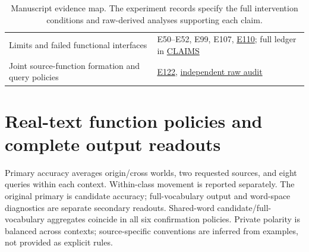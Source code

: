 \documentclass[11pt]{article}
\begin{document}
\begin{table}[t]
\begin{tabularx}{\textwidth}{>{\raggedright\arraybackslash}X>{\raggedleft\arraybackslash}X}
Limits and failed functional interfaces & E50--E52, E99, E107, \href{experiments/E110-learned-relation-fixed-label-stream.md}{E110}; full ledger in \href{CLAIMS.md}{CLAIMS} \\
Joint source-function formation and query policies & \href{experiments/E122-source-preserving-formation.md}{E122}, \href{results/e122/independent_review_2026-10-12.md}{independent raw audit} \\
\bottomrule
\end{tabularx}
\caption{Manuscript evidence map. The experiment records specify the full intervention conditions and raw-derived analyses supporting each claim.}
\end{table}

\section{Real-text function policies and complete output readouts}\label{real-text-function-policies-and-complete-output-readouts}

Primary accuracy averages origin/cross worlds, two requested sources, and eight queries within each context. Within-class movement is reported separately. The original primary is candidate accuracy; full-vocabulary output and word-space diagnostics are separate secondary readouts. Shared-word candidate/full-vocabulary aggregates coincide in all six confirmation policies. Private polarity is balanced across contexts; source-specific conventions are inferred from examples, not provided as explicit rules.
\end{document}
